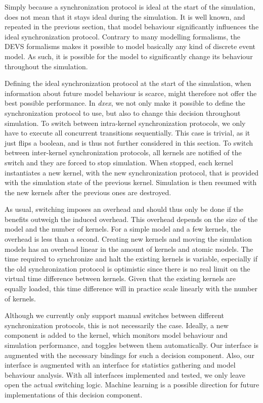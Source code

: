 Simply because a synchronization protocol is ideal at the start of the simulation, does not mean that it stays ideal during the simulation.
It is well known, and repeated in the previous section, that model behaviour significantly influences the ideal synchronization protocol.
Contrary to many modelling formalisms, the \textsf{DEVS} formalisms makes it possible to model basically any kind of discrete event model.
As such, it is possible for the model to significantly change its behaviour throughout the simulation.

Defining the ideal synchronization protocol at the start of the simulation, when information about future model behaviour is scarce, might therefore not offer the best possible performance.
In \textit{dxex}, we not only make it possible to define the synchronization protocol to use, but also to change this decision throughout simulation.
To switch between intra-kernel synchronization protocols, we only have to execute all concurrent transitions sequentially.
This case is trivial, as it just flips a boolean, and is thus not further considered in this section.
To switch between inter-kernel synchronization protocols, all kernels are notified of the switch and they are forced to stop simulation.
When stopped, each kernel instantiates a new kernel, with the new synchronization protocol, that is provided with the simulation state of the previous kernel.
Simulation is then resumed with the new kernels after the previous ones are destroyed. 

As usual, switching imposes an overhead and should thus only be done if the benefits outweigh the induced overhead.
This overhead depends on the size of the model and the number of kernels.
For a simple model and a few kernels, the overhead is less than a second. 
Creating new kernels and moving the simulation models has an overhead linear in the amount of kernels and atomic models.
The time required to synchronize and halt the existing kernels is variable, especially if the old synchronization protocol is optimistic since there is no real limit on the virtual time difference between kernels.
Given that the existing kernels are equally loaded, this time difference will in practice scale linearly with the number of kernels.

Although we currently only support manual switches between different synchronization protocols, this is not necessarily the case.
Ideally, a new component is added to the kernel, which monitors model behaviour and simulation performance, and toggles between them automatically.
Our interface is augmented with the necessary bindings for such a decision component.
Also, our interface is augmented with an interface for statistics gathering and model behaviour analysis.
With all interfaces implemented and tested, we only leave open the actual switching logic.
Machine learning is a possible direction for future implementations of this decision component.

